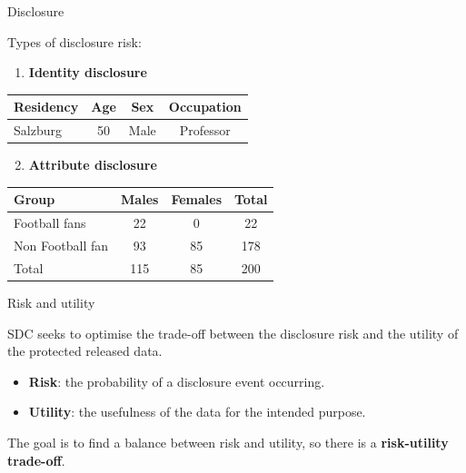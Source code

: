 \documentclass[
	aspectratio = 169
 ]{beamer}
\begin{document}
\begin{frame}{Disclosure}

Types of disclosure risk:

\begin{enumerate}
[(1)]
\tightlist
\item
  \textbf{Identity disclosure}
\end{enumerate}

\vspace{-2em}
\begin{table}[ht] 
\centering
\begin{tabular}[t]{lccc}
\toprule
Residency&Age&Sex&Occupation\\
\midrule
Salzburg&50&Male&Professor\\
\bottomrule
\end{tabular}
\end{table}

\begin{enumerate}
[(1)]
\setcounter{enumi}{1}
\tightlist
\item
  \textbf{Attribute disclosure}
\end{enumerate}

\vspace{-2em}
\begin{table}[ht]
\centering
\begin{tabular}[t]{lccc}
\toprule
Group&Males&Females&Total\\
\midrule
Football fans&22&0&22\\
Non Football fan&93&85&178\\
Total&115&85&200\\
\bottomrule
\end{tabular}
\end{table}

\end{frame}
\begin{frame}{Risk and utility}

SDC seeks to optimise the trade-off between the disclosure risk and the
utility of the protected released data.

\begin{itemize}
\item
  \textbf{Risk}: the probability of a disclosure event occurring.
\item
  \textbf{Utility}: the usefulness of the data for the intended purpose.
\end{itemize}

\vspace{1em}
The goal is to find a balance between risk and utility, so there is a \textbf{risk-utility trade-off}.

\end{frame}
\end{document}
